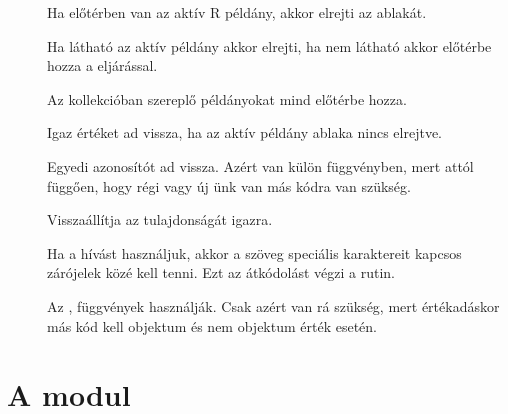 \begin{description}
\item[] Ha előtérben van az aktív R példány, akkor
  elrejti az ablakát.
\item[] Ha látható az aktív  példány akkor
  elrejti, ha nem látható akkor előtérbe hozza a
   eljárással. 
\item[] Az  kollekcióban
  szereplő  példányokat mind előtérbe hozza.
\item[] Igaz értéket ad vissza, ha az aktív 
  példány ablaka nincs elrejtve. 
\item[] Egyedi azonosítót ad vissza. Azért van külön
  függvényben, mert attól függően, 
  hogy régi vagy új ünk van más kódra van szükség.
\item[] Visszaállítja az 
   tulajdonságát igazra. 
\item[] Ha a  hívást használjuk, akkor a
  szöveg speciális karaktereit kapcsos zárójelek közé kell tenni. Ezt
  az átkódolást végzi a rutin. 
\item[] Az ,  függvények
  használják. Csak azért van rá szükség, mert 
  értékadáskor más kód kell objektum és nem objektum érték esetén.
\end{description}

\section{A  modul}\label{sec:5.5}

